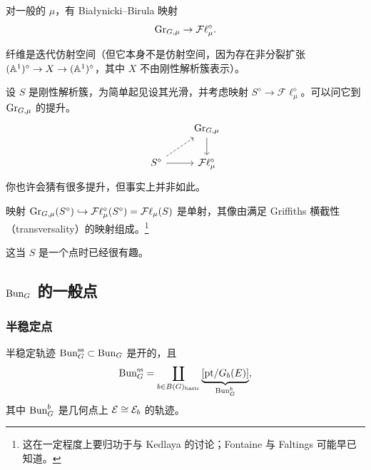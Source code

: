 \begin{remark}
对一般的 $\mu$，有 Białynicki–Birula 映射
\[
\Gr_{G,\mu}\to\mathcal{F}\ell^{\diamond}_\mu.
\]


纤维是迭代仿射空间（但它本身不是仿射空间，因为存在非分裂扩张 $(\AA^1)^{\diamond}\to X\to(\AA^1)^{\diamond}$，其中 $X$ 不由刚性解析簇表示）。

设 $S$ 是刚性解析簇，为简单起见设其光滑，并考虑映射 $S^{\diamond}\to\mathcal{F}\ell^{\diamond}_\mu$。可以问它到 $\Gr_{G,\mu}$ 的提升。
\[
\begin{tikzcd}
& \Gr_{G,\mu} \arrow[d] \\
S^{\diamond} \arrow[ur, dashed] \arrow[r] & \mathcal{F}\ell^{\diamond}_\mu
\end{tikzcd}
\]
你也许会猜有很多提升，但事实上并非如此。
\end{remark}

\begin{theorem}[{[S14]}]
映射 $\Gr_{G,\mu}(S^{\diamond})\hookrightarrow\mathcal{F}\ell^{\diamond}_\mu(S^{\diamond})=\mathcal{F}\ell_\mu(S)$ 是单射，其像由满足 Griffiths 横截性（transversality）的映射组成。\footnote{这在一定程度上要归功于与 Kedlaya 的讨论；Fontaine 与 Faltings 可能早已知道。}
\end{theorem}

这当 $S$ 是一个点时已经很有趣。

\subsection{$\Bun_G$ 的一般点}

\subsubsection{半稳定点}

\begin{theorem}
半稳定轨迹 $\Bun^{\mathrm{ss}}_G\subset\Bun_G$ 是开的，且
\[
\Bun^{\mathrm{ss}}_G=\coprod_{b\in B(G)_{\mathrm{basic}}}\underbrace{[\mathrm{pt}/G_b(E)]}_{\Bun^b_G},
\]
其中 $\Bun^b_G$ 是几何点上 $\cE\cong\cE_b$ 的轨迹。
\end{theorem}

